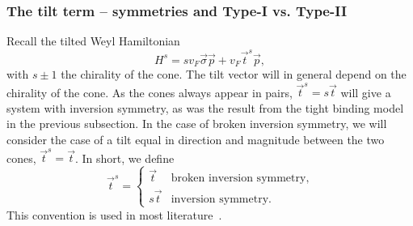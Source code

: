 \subsubsection{The tilt term -- symmetries and Type-I vs.\! Type-II}
Recall the tilted Weyl Hamiltonian
\[
H^s = s v_F \vec{\sigma} \vec{p} + v_F \vec{t}^s \vec{p},
\]
with \( s \pm 1 \) the chirality of the cone.
The tilt vector will in general depend on the chirality of the cone.
As the cones always appear in pairs, \( \vec{t}^s = s \vec{t} \) will give a system with inversion symmetry, as was the result from the tight binding model in the previous subsection.
In the case of broken inversion symmetry, we will consider the case of a tilt equal in direction and magnitude between the two cones, \( \vec{t}^s = \vec{t} \).
In short, we define
\begin{equation}
  \vec{t}^s =
  \begin{cases}
    \vec{t} & \text{broken inversion symmetry},\\
    s \vec{t} & \text{inversion symmetry}.
  \end{cases}\label{eq:11}
\end{equation}
This convention is used in most literature~\cite{vanderwurffMagnetovorticalThermoelectricTransport2019,ferreirosAnomalousNernstThermal2017}.

